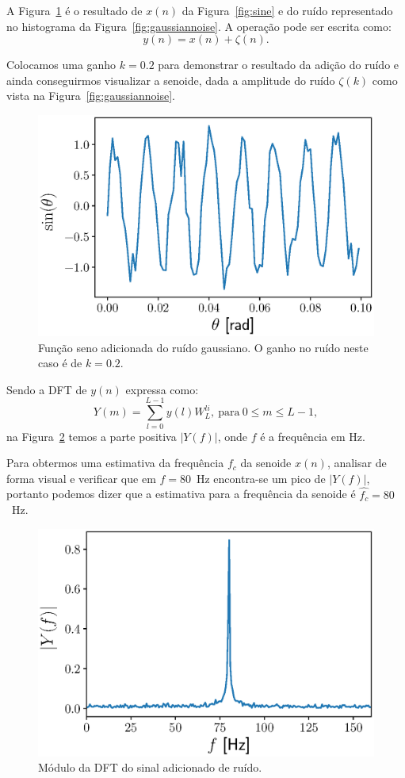 \documentclass{homeworkclass}
\begin{document}
\begin{homeworkProblem}
	A Figura~\ref{fig:sineandnoise} é o resultado de $x(n)$ da Figura~\ref{fig:sine} e do ruído representado no histograma da Figura~\ref{fig:gaussiannoise}. A operação pode ser escrita como:
	\begin{equation*}
	y(n) = x(n) + \zeta(n).
	\end{equation*}
	
	Colocamos uma ganho $k = 0.2$ para demonstrar o resultado da adição do ruído e ainda conseguirmos visualizar a senoide, dada a amplitude do ruído $\zeta(k)$ como vista na Figura~\ref{fig:gaussiannoise}.
	\begin{figure}[!h]
		\centering
		\includegraphics[width=0.6\linewidth]{figs/sine_and_noise}
		\caption{Função seno adicionada do ruído gaussiano. O ganho no ruído neste caso é de $k = 0.2$.}
		\label{fig:sineandnoise}
	\end{figure}

	Sendo a DFT de $y(n)$ expressa como: 
	\begin{equation}\label{eq:dft}
	Y(m) = \sum_{l=0}^{L - 1} y(l) W^{li}_L, ~\textrm{para}~ 0 \leq m \leq L - 1,
	\end{equation}
	na Figura~\ref{fig:dft} temos a parte positiva $|Y(f)|$, onde $f$ é a frequência em Hz.

	Para obtermos uma estimativa da frequência $f_{c}$ da senoide $x(n)$, analisar de forma visual e verificar que em $f = 80$~Hz encontra-se um pico de $|Y(f)|$, portanto podemos dizer que a estimativa para a frequência da senoide é $\hat{f_c} = 80$~Hz.
	\begin{figure}[!ht]
		\centering
		\includegraphics[width=0.65\linewidth]{figs/dft}
		\caption{Módulo da DFT do sinal adicionado de ruído.}
		\label{fig:dft}
	\end{figure}


\end{homeworkProblem}
\end{document}
